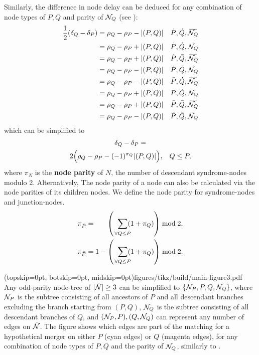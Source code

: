 Similarly, the difference in node delay can be deduced for any combination of node types of $P,Q$ and parity of $\mathcal{N}_Q$ (see ):
\begin{align*}
  \frac{1}{2}(\delta_Q-\delta_P) &= \rho_Q - \rho_P - \abs{(P,Q)}  &\dot{P}, \dot{Q}, \overbar{\nset_Q} \\
  &= \rho_Q - \rho_P + \abs{(P,Q)}  &\dot{P}, \dot{Q}, \dot{\nset_Q} \\
  &= \rho_Q - \rho_P + \abs{(P,Q)}  &\dot{P}, \bar{Q}, \overbar{\nset_Q} \\
  &= \rho_Q - \rho_P - \abs{(P,Q)}  &\dot{P}, \bar{Q}, \dot{\nset_Q} \\
  &= \rho_Q - \rho_P - \abs{(P,Q)}  &\bar{P}, \dot{Q}, \overbar{\nset_Q} \\
  &= \rho_Q - \rho_P + \abs{(P,Q)}  &\bar{P}, \dot{Q}, \dot{\nset_Q} \\
  &= \rho_Q - \rho_P + \abs{(P,Q)}  &\bar{P}, \bar{Q}, \overbar{\nset_Q} \\
  &= \rho_Q - \rho_P - \abs{(P,Q)}  &\bar{P}, \bar{Q}, \dot{\nset_Q} \\
\end{align*}
which can be simplified to 
\begin{multline}\label{eq:pmwdif}
    \delta_Q - \delta_P = \\
    2\Big(\rho_Q-\rho_P - (-1)^{\pi_Q}\lvert(P,Q)\rvert\Big), \hspace{.3cm} Q\leq P,
\end{multline}
where $\pi_N$ is the \textbf{node parity} of $N$, the number of descendant syndrome-nodes modulo 2. Alternatively, The node parity of a node can also be calculated via the node parities of its children nodes. We define the node parity for syndrome-nodes and junction-nodes. 
\begin{align}
    \pi_{\dot{P}} &= \hspace{.6cm}\left(\hspace{.2cm} \sum_{\mathclap{\forall Q \leq \dot{P}}} (1+\pi_Q) \right ) \bmod 2, \label{eq:snodeparity}\\
    \pi_{\bar{P}} &= 1 - \left(\hspace{.2cm} \sum_{\mathclap{\forall Q \leq \bar{P}}} (1+\pi_Q) \right) \bmod 2. \label{eq:jnodeparity}
\end{align}

\Figure[tb](topskip=0pt, botskip=0pt, midskip=0pt){figures/tikz/build/main-figure3.pdf}{
  Any odd-parity node-tree of $\lvert\dot{\mathcal{N}}\rvert\geq 3$ can be simplified to $\{\mathcal{N}_P,P,Q,\mathcal{N}_Q\}$, where $\mathcal{N}_P$ is the subtree consisting of all ancestors of $P$ and all descendant branches excluding the branch starting from $(P,Q)$, $\mathcal{N}_Q$ is the subtree consisting of all descendant branches of $Q$, and $(\mathcal{N}_P, P), (Q, \mathcal{N}_Q)$ can represent any number of edges on $\dot{\mathcal{N}}$. The figure shows which edges are part of the matching for a hypothetical merger on either $P$ (cyan edges) or $Q$ (magenta edges), for any combination of node types of $P,Q$ and the parity of $\mathcal{N}_Q$, similarly to .
  \label{fig:nmcombi}}

